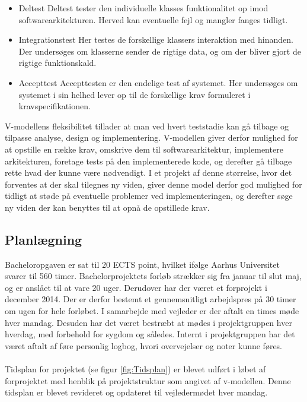 \documentclass[rapport.tex]{subfiles}
\begin{document}
	\begin{itemize}
		\item Deltest
		\subitem Deltest tester den individuelle klasses funktionalitet op imod softwarearkitekturen. Herved kan eventuelle fejl og mangler fanges tidligt. 
		\item Integrationstest
		\subitem Her testes de forskellige klassers interaktion med hinanden. Der undersøges om klasserne sender de rigtige data, og om der bliver gjort de rigtige funktionskald. 
		\item Accepttest
		\subitem Accepttesten er den endelige test af systemet. Her undersøges om systemet i sin helhed lever op til de forskellige krav formuleret i kravspecifikationen. \\
		
	\end{itemize}
	
	
	V-modellens fleksibilitet tillader at man ved hvert teststadie kan gå tilbage og tilpasse analyse, design og implementering. 
	V-modellen giver derfor mulighed for at opstille en række krav, omskrive dem til softwarearkitektur, implementere arkitekturen, foretage tests på den implementerede kode, og derefter gå tilbage rette hvad der kunne være nødvendigt. 
	I et projekt af denne størrelse, hvor det forventes at der skal tilegnes ny viden, giver denne model derfor god mulighed for tidligt at støde på eventuelle problemer ved implementeringen, og derefter søge ny viden der kan benyttes til at opnå de opstillede krav. 
	
	\subsection{Planlægning}
	Bacheloropgaven er sat til 20 ECTS point, hvilket ifølge Aarhus Universitet svarer til 560 timer. Bachelorprojektets forløb strækker sig fra januar til slut maj, og er anslået til at vare 20 uger. Derudover har der været et forprojekt i december 2014. Der er derfor bestemt et gennemsnitligt arbejdspres på 30 timer om ugen for hele forløbet. I samarbejde med vejleder er der aftalt en times møde hver mandag. Desuden har det været bestræbt at mødes i projektgruppen hver hverdag, med forbehold for sygdom og således. Internt i projektgruppen har det været aftalt af føre personlig logbog, hvori overvejelser og noter kunne føres. \\
	\\
	Tidsplan for projektet (se figur \ref{fig:Tidsplan}) er blevet udført i løbet af forprojektet med henblik på projektstruktur som angivet af v-modellen. Denne tidsplan er blevet revideret og opdateret til vejledermødet hver mandag. 
	
\end{document}
